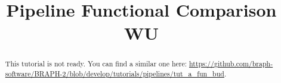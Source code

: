 \documentclass[justified]{tufte-handout}
\title{Pipeline Functional Comparison WU}
\begin{document}
\maketitle

\begin{abstract}
\noindent
This tutorial is not ready. You can find a similar one here: \url{https://github.com/braph-software/BRAPH-2/blob/develop/tutorials/pipelines/tut_a_fun_bud}.
\end{abstract}
\end{document}
